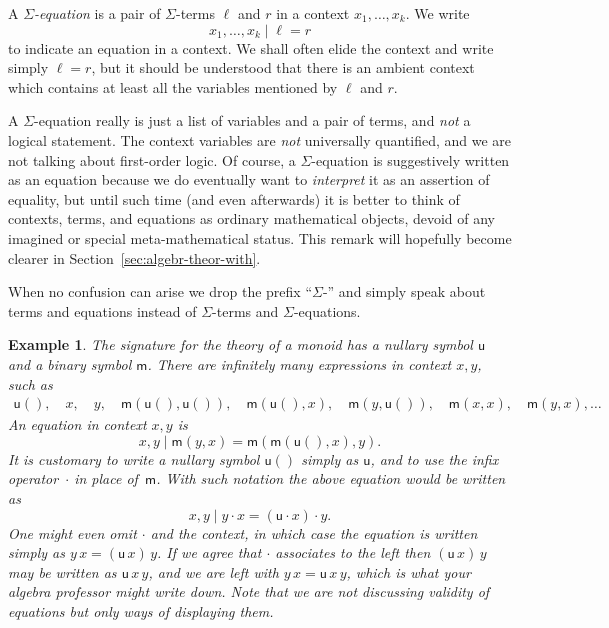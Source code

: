 \documentclass{amsart}
\newtheorem{example}[definition]{Example}
\begin{document}
A \emph{$\Sigma$-equation} is a pair of $\Sigma$-terms $\ell$ and $r$ in a context
$x_1, \ldots, x_k$. We write
%
\begin{equation*}
  x_1, \ldots, x_k \mid \ell = r
\end{equation*}
%
to indicate an equation in a context. We shall often elide the context and write simply
$\ell = r$, but it should be understood that there is an ambient context which contains at
least all the variables mentioned by $\ell$ and $r$.

A $\Sigma$-equation really is just a list of variables and a pair of terms, and
\emph{not} a logical statement. The context variables are \emph{not} universally
quantified, and we are not talking about first-order logic. Of course, a
$\Sigma$-equation is suggestively written as an equation because we do
eventually want to \emph{interpret} it as an assertion of equality, but until
such time (and even afterwards) it is better to think of contexts, terms, and
equations as ordinary mathematical objects, devoid of any imagined or special
meta-mathematical status. This remark will hopefully become clearer in
Section~\ref{sec:algebr-theor-with}.

When no confusion can arise we drop the prefix ``$\Sigma$-'' and simply speak about
terms and equations instead of $\Sigma$-terms and $\Sigma$-equations.


\begin{example}
  \label{ex:monoid-signature}
  The signature for the theory of a monoid has a nullary symbol $\mathsf{u}$ and a binary
  symbol $\mathsf{m}$. There are infinitely many expressions in context $x, y$, such as
  \begin{align*}
    \mathsf{u}(),\quad
    x,\quad
    y,\quad
    \mathsf{m}(\mathsf{u}(), \mathsf{u}()),\quad
    \mathsf{m}(\mathsf{u}(), x),\quad
    \mathsf{m}(y, \mathsf{u}()),\quad
    \mathsf{m}(x, x),\quad
    \mathsf{m}(y, x),
    \ldots
  \end{align*}
  An equation in context $x, y$ is
  \begin{equation*}
    x, y \mid \mathsf{m}(y, x) = \mathsf{m}(\mathsf{m}(\mathsf{u}(), x), y).
  \end{equation*}
  It is customary to write a nullary symbol $\mathsf{u}()$ simply as $\mathsf{u}$, and to
  use the infix operator~$\cdot$ in place of~$\mathsf{m}$. With such notation the
  above equation would be written as
  \begin{equation*}
    x, y \mid y \cdot x = (\mathsf{u} \cdot x) \cdot y.
  \end{equation*}
  One might even omit $\cdot$ and the context, in which case the equation is
  written simply as $y \, x = (\mathsf{u} \, x) \, y$. If we agree that $\cdot$
  associates to the left then $(\mathsf{u} \, x) \, y$ may be written as
  $\mathsf{u} \, x \, y$, and we are left with $y \, x = \mathsf{u} \, x \, y$,
  which is what your algebra professor might write down. Note that we are
  \emph{not} discussing validity of equations but only ways of displaying them.
\end{example}
\end{document}
